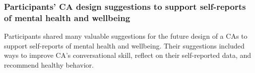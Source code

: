             




    
  
            




\subsubsection{Participants' \ac{CA} design suggestions to support self-reports of mental health and wellbeing}
    Participants shared many valuable suggestions for the future design of a \acp{CA} to support self-reports of mental health and wellbeing. 
    Their suggestions included ways to
        improve \ac{CA}'s conversational skill,
        reflect on their self-reported data, and
        recommend healthy behavior.

        
